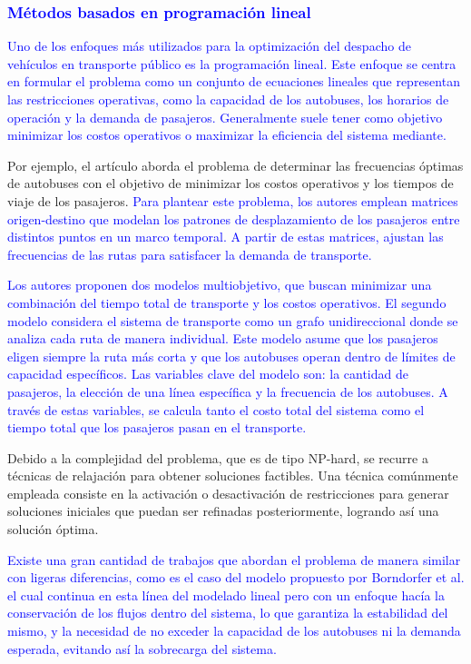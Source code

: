 \documentclass[preprint,11pt]{elsarticle}
\newcommand{\Blue}[1]{\textcolor{blue}{#1}}
\begin{document}
\Blue{\subsubsection{Métodos basados en programación lineal}}

\Blue{Uno de los enfoques más utilizados para la optimización del despacho de vehículos en transporte público es la programación lineal. Este enfoque se centra en formular el problema como un conjunto de ecuaciones lineales que representan las restricciones operativas, como la capacidad de los autobuses, los horarios de operación y la demanda de pasajeros. Generalmente suele tener como objetivo minimizar los costos operativos o maximizar la eficiencia del sistema mediante.}

Por ejemplo, el artículo \cite{borndorfer2005} aborda el problema de determinar las frecuencias óptimas de autobuses con el objetivo de minimizar los costos operativos y los tiempos de viaje de los pasajeros. \Blue{Para plantear este problema, los autores emplean matrices origen-destino que modelan los patrones de desplazamiento de los pasajeros entre distintos puntos en un marco temporal. A partir de estas matrices, ajustan las frecuencias de las rutas para satisfacer la demanda de transporte.}

\Blue{Los autores proponen dos modelos multiobjetivo, que buscan minimizar una combinación del tiempo total de transporte y los costos operativos. El segundo modelo considera el sistema de transporte como un grafo unidireccional donde se analiza cada ruta de manera individual. Este modelo asume que los pasajeros eligen siempre la ruta más corta y que los autobuses operan dentro de límites de capacidad específicos. Las variables clave del modelo son: la cantidad de pasajeros, la elección de una línea específica y la frecuencia de los autobuses. A través de estas variables, se calcula tanto el costo total del sistema como el tiempo total que los pasajeros pasan en el transporte.}

Debido a la complejidad del problema, que es de tipo NP-hard, se recurre a técnicas de relajación para obtener soluciones factibles. Una técnica comúnmente empleada consiste en la activación o desactivación de restricciones para generar soluciones iniciales que puedan ser refinadas posteriormente, logrando así una solución óptima.


\Blue{Existe una gran cantidad de trabajos que abordan el problema de manera similar con ligeras diferencias, como es el caso del modelo propuesto por Borndorfer et al. \cite{borndorfer2005} el cual continua en esta línea del modelado lineal pero con un enfoque hacía la conservación de los flujos dentro del sistema, lo que garantiza la estabilidad del mismo, y la necesidad de no exceder la capacidad de los autobuses ni la demanda esperada, evitando así la sobrecarga del sistema.} 
\end{document}
